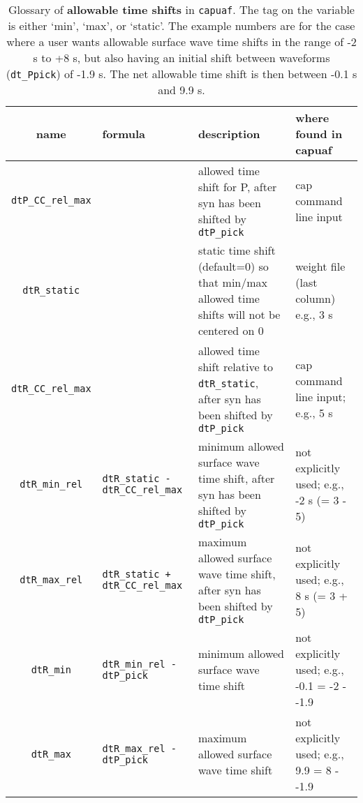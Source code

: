 
\begin{table}[h]
\caption[]
{
Glossary of {\bf allowable time shifts} in {\tt capuaf}.
The tag on the variable is either `min', `max', or `static'. The example numbers are for the case where a user wants allowable surface wave time shifts in the range of -2 s to +8 s, but also having an initial shift between waveforms (\texttt{dt\_Ppick}) of -1.9 s. The net allowable time shift is then between -0.1 s and 9.9 s.
\label{tab:tshift_allow}
}
\hspace{-0.5cm}
\begin{tabular}{|c|p{3cm}|p{6cm}|p{4cm}|}
\hline
name & formula & description & where found in capuaf \\ \hline
\hline
\verb+dtP_CC_rel_max+
& 
& allowed time shift for P, after syn has been shifted by \verb+dtP_pick+
& cap command line input
\\ \hline
\verb+dtR_static+
&
& static time shift (default=0) so that min/max allowed time shifts will not be centered on 0
& weight file (last column) \linebreak e.g., 3 s
\\ \hline
\verb+dtR_CC_rel_max+
&
& allowed time shift relative to \verb+dtR_static+, after syn has been shifted by \verb+dtP_pick+
& cap command line input; \linebreak e.g., 5 s
\\ \hline
\verb+dtR_min_rel+
& \texttt{dtR\_static - dtR\_CC\_rel\_max}
& minimum allowed surface wave time shift, after syn has been shifted by \verb+dtP_pick+
& not explicitly used; \linebreak e.g., -2 s (= 3 - 5)
\\ \hline
\verb+dtR_max_rel+
& \texttt{dtR\_static + dtR\_CC\_rel\_max}
& maximum allowed surface wave time shift, after syn has been shifted by \verb+dtP_pick+
& not explicitly used; \linebreak e.g., 8 s (= 3 + 5)
\\ \hline
\verb+dtR_min+
& \texttt{dtR\_min\_rel - dtP\_pick}
& minimum allowed surface wave time shift
& not explicitly used; \linebreak e.g., -0.1 = -2 - -1.9
\\ \hline
\verb+dtR_max+
& \texttt{dtR\_max\_rel - dtP\_pick}
& maximum allowed surface wave time shift
& not explicitly used; \linebreak e.g., 9.9 = 8 - -1.9
\\ \hline
\end{tabular}
\end{table}
